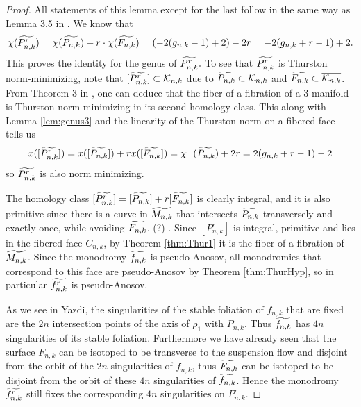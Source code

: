 \begin{proof}
    All statements of this lemma except for the last follow in the same way as Lemma 3.5 in \cite{yazdi2018pseudo}. We know that
    $$\chi(\widetilde{P^r_{n,k}}) = \chi(\widetilde{P_{n,k}}) + r\cdot\chi(\widetilde{F_{n,k}}) = (-2(g_{n,k} - 1) + 2)-2r = -2(g_{n,k} + r - 1) + 2.$$ This proves the identity for the genus of $\widetilde{P^r_{n,k}}.$ To see that $\widetilde{P^r_{n,k}}$ is Thurston norm-minimizing, note that $[\widetilde{P^r_{n,k}}] \subset \mathcal{K}_{n,k}$ due to $\widetilde{P_{n,k}} \subset \mathcal{K}_{n,k}$ and $\widetilde{F_{n,k}} \subset \overline{\mathcal{K}_{n,k}}$. From Theorem 3 in \cite{thurston1986norm}, one can deduce that the fiber of a fibration of a 3-manifold is Thurston norm-minimizing in its second homology class. This along with Lemma \ref{lem:genus3} and the linearity of the Thurston norm on a fibered face tells us
    \begin{align*}
        x([\widetilde{P^r_{n,k}}]) = x([\widetilde{P_{n,k}}]) + rx([\widetilde{F_{n,k}}]) = \chi_-(\widetilde{P_{n,k}}) + 2r = 2(g_{n,k} + r - 1) - 2
    \end{align*}
    so $\widetilde{P^r_{n,k}}$ is also norm minimizing.

    The homology class $[\widetilde{P^r_{n,k}}] = [\widetilde{P_{n,k}}] + r[\widetilde{F_{n,k}}]$ is clearly integral, and it is also primitive since there is a curve in $\widetilde{M_{n,k}}$ that intersects $\widetilde{P_{n,k}}$ transversely and exactly once, while avoiding $\widetilde{F_{n,k}}$. (?) . Since $[P^r_{n,k}]$ is integral, primitive and lies in the fibered face $C_{n,k}$, by Theorem \ref{thm:Thur1} it is the fiber of a fibration of $\widetilde{M_{n,k}}$. Since the monodromy $\widetilde{f_{n,k}}$ is pseudo-Anosov, all monodromies that correspond to this face are pseudo-Anosov by Theorem \ref{thm:ThurHyp}, so in particular $\widetilde{f^r_{n,k}}$ is pseudo-Anosov.

    As we see in Yazdi, the singularities of the stable foliation of $f_{n,k}$ that are fixed are the $2n$ intersection points of the axis of $\rho_1$ with $P_{n,k}$. Thus $\widetilde{f_{n,k}}$ has $4n$ singularities of its stable foliation. Furthermore we have already seen that the surface $F_{n,k}$ can be isotoped to be transverse to the suspension flow and disjoint from the orbit of the $2n$ singularities of $f_{n,k}$, thus $\widetilde{F_{n,k}}$ can be isotoped to be disjoint from the orbit of these $4n$ singularities of $\widetilde{f_{n,k}}$. Hence the monodromy $\widetilde{f^r_{n,k}}$ still fixes the corresponding $4n$ singularities on $P^r_{n,k}$.


\end{proof}
